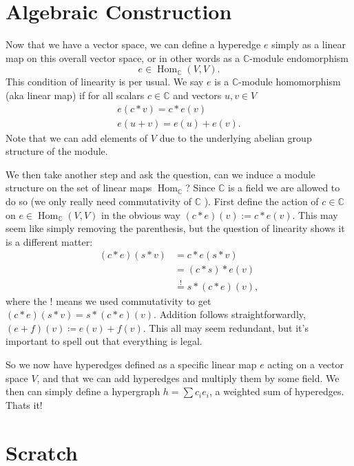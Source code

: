 \documentclass{article}
\newcommand{\field}{\mathbb{C}}
\DeclareMathOperator{\Hom}{Hom}
\begin{document}
\section{Algebraic Construction}
Now that we have a vector space, we can define a hyperedge $e$ simply as a linear map on this overall vector space, or in other words as a $\field$-module endomorphism
\begin{equation}
    e \in \Hom_{\field} (V, V).
\end{equation}
This condition of linearity is per usual. We say $e$ is a $\field$-module homomorphism (aka linear map) if for all scalars $c \in \field$ and vectors $u, v \in V$
\begin{align}
    e(c * v) = c * e(v) \\
    e (u + v) = e(u) + e(v).
\end{align}
Note that we can add elements of $V$ due to the underlying abelian group structure of the module. 

We then take another step and ask the question, can we induce a module structure on the set of linear maps $\Hom_{\field}$? Since $\field$ is a field we are allowed to do so (we only really need commutativity of $\field$ ). First define the action of $c \in \field$ on $e \in \Hom_\field(V, V)$ in the obvious way $(c * e) (v) := c * e(v)$. This may seem like simply removing the parenthesis, but the question of linearity shows it is a different matter:
\begin{align}
    (c * e) (s * v) &= c * e( s * v) \\
    &= (c * s) * e(v) \\
    &\overset{!}{=} s * (c * e) (v),
\end{align}
where the ! means we used commutativity to get $(c *e) (s * v) = s * (c * e) (v)$. Addition follows straightforwardly, $(e+f) (v) \coloneqq e(v) + f(v)$. This all may seem redundant, but it's important to spell out that everything is legal.

So we now have hyperedges defined as a specific linear map $e$ acting on a vector space $V$, and that we can add hyperedges and multiply them by some field. We then can simply define a hypergraph $h = \sum c_i e_i$, a weighted sum of hyperedges. Thats it! 


\section{Scratch}
\end{document}
